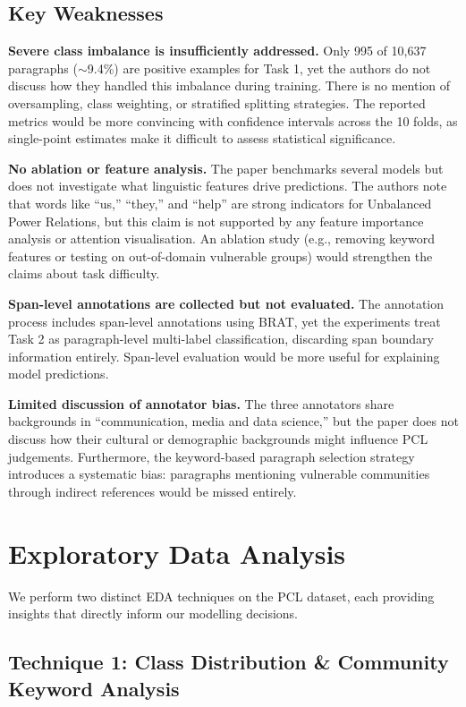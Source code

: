 \documentclass[12pt,twoside]{report}
\begin{document}
\section{Key Weaknesses}

\textbf{Severe class imbalance is insufficiently addressed.} Only 995 of 10,637 paragraphs ($\sim$9.4\%) are positive examples for Task 1, yet the authors do not discuss how they handled this imbalance during training. There is no mention of oversampling, class weighting, or stratified splitting strategies. The reported metrics would be more convincing with confidence intervals across the 10 folds, as single-point estimates make it difficult to assess statistical significance.

\textbf{No ablation or feature analysis.} The paper benchmarks several models but does not investigate what linguistic features drive predictions. The authors note that words like ``us,'' ``they,'' and ``help'' are strong indicators for Unbalanced Power Relations, but this claim is not supported by any feature importance analysis or attention visualisation. An ablation study (e.g., removing keyword features or testing on out-of-domain vulnerable groups) would strengthen the claims about task difficulty.

\textbf{Span-level annotations are collected but not evaluated.} The annotation process includes span-level annotations using BRAT, yet the experiments treat Task 2 as paragraph-level multi-label classification, discarding span boundary information entirely. Span-level evaluation would be more useful for explaining model predictions.

\textbf{Limited discussion of annotator bias.} The three annotators share backgrounds in ``communication, media and data science,'' but the paper does not discuss how their cultural or demographic backgrounds might influence PCL judgements. Furthermore, the keyword-based paragraph selection strategy introduces a systematic bias: paragraphs mentioning vulnerable communities through indirect references would be missed entirely.


\chapter{Exploratory Data Analysis}

We perform two distinct EDA techniques on the PCL dataset, each providing insights that directly inform our modelling decisions.

\section{Technique 1: Class Distribution \& Community Keyword Analysis}
\end{document}
